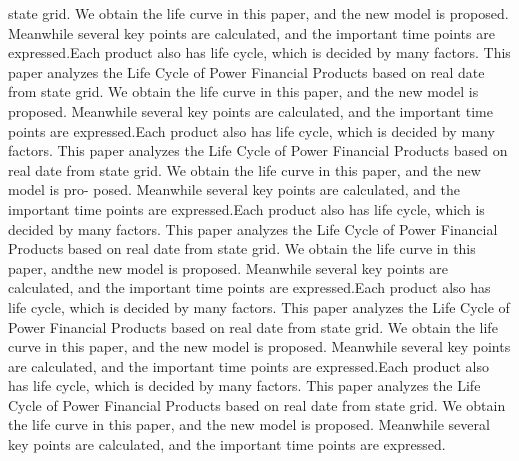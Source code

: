 \documentclass[11pt]{article}
\begin{document}
\begin{multicols}{2}
		state grid. We obtain the life curve in this paper, and
		the new model is proposed. Meanwhile several key
		points are calculated, and the important time points
		are expressed.Each product also has life cycle, which
		is decided by many factors. This paper analyzes the
		Life Cycle of Power Financial Products based on real
		date from state grid. We obtain the life curve in this
		paper, and the new model is proposed. Meanwhile
		several key points are calculated, and the important
		time points are expressed.Each product also has life
		cycle, which is decided by many factors. This paper
		analyzes the Life Cycle of Power Financial Products
		based on real date from state grid. We obtain the
		life curve in this paper, and the new model is pro-
		posed. Meanwhile several key points are calculated,
		and the important time points are expressed.Each
		product also has life cycle, which is decided by many
		factors. This paper analyzes the Life Cycle of Power
		Financial Products based on real date from state
		grid. We obtain the life curve in this paper, andthe new model is proposed. Meanwhile several key
		points are calculated, and the important time points
		are expressed.Each product also has life cycle, which
		is decided by many factors. This paper analyzes the
		Life Cycle of Power Financial Products based on real
		date from state grid. We obtain the life curve in this
		paper, and the new model is proposed. Meanwhile
		several key points are calculated, and the important
		time points are expressed.Each product also has life
		cycle, which is decided by many factors. This paper
		analyzes the Life Cycle of Power Financial Products
		based on real date from state grid. We obtain the life
		curve in this paper, and the new model is proposed.
		Meanwhile several key points are calculated, and the
		important time points are expressed.
	\end{multicols}
\end{document}
